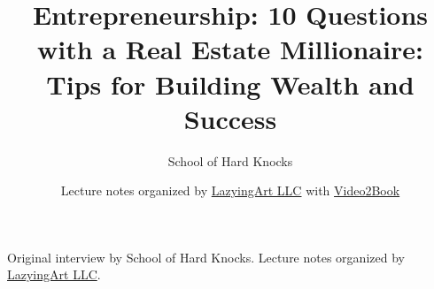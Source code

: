 \documentclass[11pt,oneside]{book}
\begin{document}
\frontmatter
\title{Entrepreneurship: 10 Questions with a Real Estate Millionaire: Tips for Building Wealth and Success}
\author{School of Hard Knocks}
\date{Lecture notes organized by \href{https://lazying.art}{LazyingArt LLC} with \href{https://github.com/lachlanchen/Video2Book}{Video2Book}}
\maketitle
\begin{center}
\small Original interview by School of Hard Knocks. Lecture notes organized by \href{https://lazying.art}{LazyingArt LLC}.
\end{center}
\clearpage
\mainmatter

\end{document}
